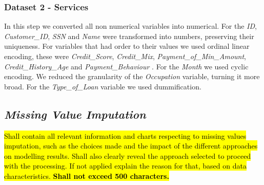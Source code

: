 \documentclass[10pt]{extarticle}
\newcommand{\ctext}[3][RGB]{%
  \begingroup
  \definecolor{hlcolor}{#1}{#2}\sethlcolor{hlcolor}%
  \hl{#3}%
  \endgroup
}
\begin{document}
\subsubsection*{Dataset 2 - Services}
In this step we converted all non numerical variables into numerical. For the \textit{ID}, \textit{Customer\_ID},
\textit{SSN} and \textit{Name} were transformed into numbers, preserving their uniqueness. For variables that had order 
to their values we used ordinal linear encoding, these were \textit{Credit\_Score}, \textit{Credit\_Mix}, 
\textit{Payment\_of\_Min\_Amount}, \textit{Credit\_History\_Age} and \textit{Payment\_Behaviour} . For the \textit{Month} we used 
cyclic encoding. We reduced the granularity of the \textit{Occupation} variable, turning it more broad. For the \textit{Type\_of\_Loan}
variable we used dummification. 

\subsection*{\textit{Missing Value Imputation}}
\ctext[RGB]{190,190,190}{Shall contain all relevant information and charts respecting to missing values imputation, such as the choices made and the impact of the different approaches on modelling results. Shall also clearly reveal the approach selected to proceed with the processing. If not applied explain the reason for that, based on data characteristics.  \textbf{Shall not exceed 500 characters.}}
\end{document}
